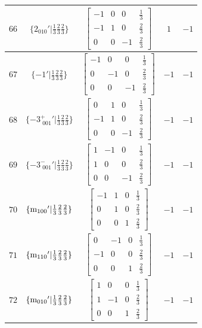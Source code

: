\documentclass[fleqn,8pt]{jsarticle}
\begin{document}
\begin{longtable}{ccccc}
$ 66 $ & $ \{2{}_{010}{}'|\frac{1}{3} \frac{2}{3} \frac{2}{3}\} $ & $ \begin{bmatrix} -1 & 0 & 0 & \frac{1}{3} \\ -1 & 1 & 0 & \frac{2}{3} \\ 0 & 0 & -1 & \frac{2}{3} \end{bmatrix} $ & $ 1 $ & $ -1 $ \\ \hline
$ 67 $ & $ \{-1{}'|\frac{1}{3} \frac{2}{3} \frac{2}{3}\} $ & $ \begin{bmatrix} -1 & 0 & 0 & \frac{1}{3} \\ 0 & -1 & 0 & \frac{2}{3} \\ 0 & 0 & -1 & \frac{2}{3} \end{bmatrix} $ & $ -1 $ & $ -1 $ \\ \hline
$ 68 $ & $ \{-3^{+}_{\,\,001}{}'|\frac{1}{3} \frac{2}{3} \frac{2}{3}\} $ & $ \begin{bmatrix} 0 & 1 & 0 & \frac{1}{3} \\ -1 & 1 & 0 & \frac{2}{3} \\ 0 & 0 & -1 & \frac{2}{3} \end{bmatrix} $ & $ -1 $ & $ -1 $ \\ \hline
$ 69 $ & $ \{-3^{-}_{\,\,001}{}'|\frac{1}{3} \frac{2}{3} \frac{2}{3}\} $ & $ \begin{bmatrix} 1 & -1 & 0 & \frac{1}{3} \\ 1 & 0 & 0 & \frac{2}{3} \\ 0 & 0 & -1 & \frac{2}{3} \end{bmatrix} $ & $ -1 $ & $ -1 $ \\ \hline
$ 70 $ & $ \{{\rm m}_{100}{}'|\frac{1}{3} \frac{2}{3} \frac{2}{3}\} $ & $ \begin{bmatrix} -1 & 1 & 0 & \frac{1}{3} \\ 0 & 1 & 0 & \frac{2}{3} \\ 0 & 0 & 1 & \frac{2}{3} \end{bmatrix} $ & $ -1 $ & $ -1 $ \\ \hline
$ 71 $ & $ \{{\rm m}_{110}{}'|\frac{1}{3} \frac{2}{3} \frac{2}{3}\} $ & $ \begin{bmatrix} 0 & -1 & 0 & \frac{1}{3} \\ -1 & 0 & 0 & \frac{2}{3} \\ 0 & 0 & 1 & \frac{2}{3} \end{bmatrix} $ & $ -1 $ & $ -1 $ \\ \hline
$ 72 $ & $ \{{\rm m}_{010}{}'|\frac{1}{3} \frac{2}{3} \frac{2}{3}\} $ & $ \begin{bmatrix} 1 & 0 & 0 & \frac{1}{3} \\ 1 & -1 & 0 & \frac{2}{3} \\ 0 & 0 & 1 & \frac{2}{3} \end{bmatrix} $ & $ -1 $ & $ -1 $ \\
\end{longtable}
\end{document}
